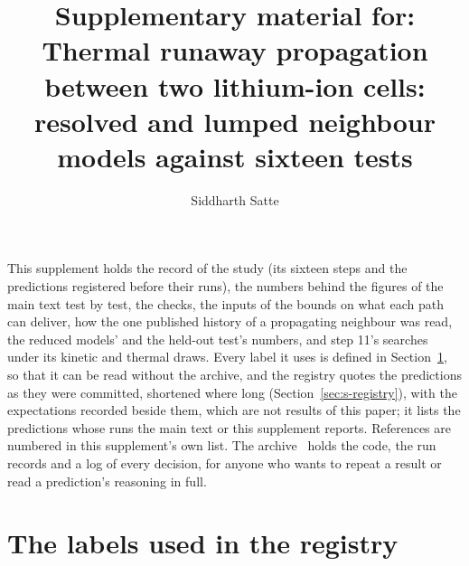 \documentclass[preprint,12pt]{elsarticle}
\begin{document}
\begin{frontmatter}
\title{Supplementary material for: Thermal runaway propagation between two lithium-ion cells: resolved and lumped neighbour models against sixteen tests}
\author{Siddharth Satte}
\address{Independent researcher, Pune, India}
\end{frontmatter}

This supplement holds the record of the study (its sixteen steps and the predictions registered before their runs), the numbers behind the figures of the main text test by test, the checks, the inputs of the bounds on what each path can deliver, how the one published history of a propagating neighbour was read, the reduced models' and the held-out test's numbers, and step 11's searches under its kinetic and thermal draws. Every label it uses is defined in Section~\ref{sec:s-key}, so that it can be read without the archive, and the registry quotes the predictions as they were committed, shortened where long (Section~\ref{sec:s-registry}), with the expectations recorded beside them, which are not results of this paper; it lists the predictions whose runs the main text or this supplement reports. References are numbered in this supplement's own list. The archive~\cite{satte2026repo} holds the code, the run records and a log of every decision, for anyone who wants to repeat a result or read a prediction's reasoning in full.

\section{The labels used in the registry}
\label{sec:s-key}
\end{document}
